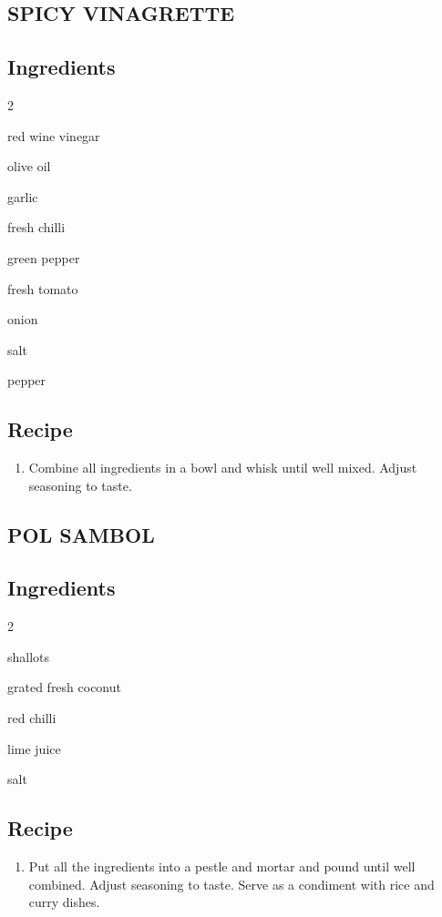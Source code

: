 \begin{minipage}{0.98\textwidth}
\subsection*{SPICY VINAGRETTE}
\subsection*{Ingredients}
\begin{multicols}{2}
\begin{ingredients}
    \item red wine vinegar
    \item olive oil
    \item garlic
    \item fresh chilli
    \item green pepper
    \item fresh tomato
    \item onion
    \item salt
    \item pepper
\end{ingredients}
\end{multicols}
\subsection*{Recipe}
\begin{enumerate}
    \item Combine all ingredients in a bowl and whisk until well mixed. Adjust seasoning to taste.
\end{enumerate}

\end{minipage}
\vspace{4em}
\begin{minipage}{0.98\textwidth}
\subsection*{POL SAMBOL}
\subsection*{Ingredients}
\begin{multicols}{2}
\begin{ingredients}
    \item shallots
    \item grated fresh coconut
    \item red chilli
    \item lime juice
    \item salt
\end{ingredients}
\end{multicols}
\subsection*{Recipe}
\begin{enumerate}
    \item Put all the ingredients into a pestle and mortar and pound until well combined. Adjust seasoning to taste. Serve as a condiment with rice and curry dishes.
\end{enumerate}

\end{minipage}
